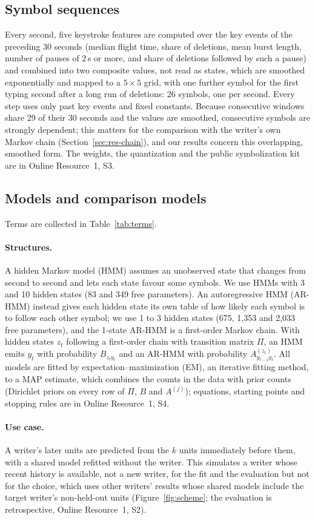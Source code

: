 \documentclass[pdflatex,sn-basic]{sn-jnl}
\newcommand{\Sref}[1]{Online Resource~1, S#1}
\begin{document}
\subsection{Symbol sequences}\label{sec:symbols}
Every second, five keystroke features are computed over the key events of the preceding 30 seconds (median flight time, share of deletions, mean burst length, number of pauses of 2\,s or more, and share of deletions followed by such a pause) and combined into two composite values, not read as states, which are smoothed exponentially and mapped to a $5\times5$ grid, with one further symbol for the first typing second after a long run of deletions: 26 symbols, one per second. Every step uses only past key events and fixed constants. Because consecutive windows share 29 of their 30 seconds and the values are smoothed, consecutive symbols are strongly dependent; this matters for the comparison with the writer's own Markov chain (Section~\ref{sec:res-chain}), and our results concern this overlapping, smoothed form. The weights, the quantization and the public symbolization kit are in \Sref{3}.

\subsection{Models and comparison models}\label{sec:models}
Terms are collected in Table~\ref{tab:terms}.
\paragraph{Structures.} A hidden Markov model (HMM) assumes an unobserved state that changes from second to second and lets each state favour some symbols. We use HMMs with 3 and 10 hidden states (83 and 349 free parameters). An autoregressive HMM (AR-HMM) instead gives each hidden state its own table of how likely each symbol is to follow each other symbol; we use 1 to 3 hidden states (675, 1,353 and 2,033 free parameters), and the 1-state AR-HMM is a first-order Markov chain. With hidden states $z_t$ following a first-order chain with transition matrix $\Pi$, an HMM emits $y_t$ with probability $B_{z_t y_t}$ and an AR-HMM with probability $A^{(z_t)}_{y_{t-1} y_t}$. All models are fitted by expectation--maximization (EM), an iterative fitting method, to a MAP estimate, which combines the counts in the data with prior counts (Dirichlet priors on every row of $\Pi$, $B$ and $A^{(j)}$); equations, starting points and stopping rules are in \Sref{4}.

\paragraph{Use case.} A writer's later units are predicted from the $k$ units immediately before them, with a shared model refitted without the writer. This simulates a writer whose recent history is available, not a new writer, for the fit and the evaluation but not for the choice, which uses other writers' results whose shared models include the target writer's non-held-out units (Figure~\ref{fig:scheme}; the evaluation is retrospective, \Sref{2}).
\end{document}
